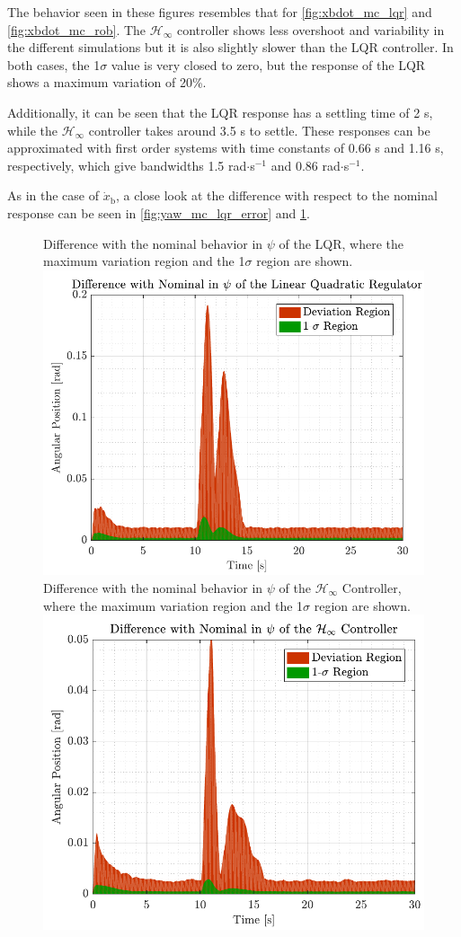 The behavior seen in these figures resembles that for \autoref{fig:xbdot_mc_lqr} and \ref{fig:xbdot_mc_rob}. The $\mathcal{H}_\infty$ controller shows less overshoot and variability in the different simulations but it is also slightly slower than the LQR controller. In both cases, the 1$\sigma$ value is very closed to zero, but the response of the LQR shows a maximum variation of 20\%.

Additionally, it can be seen that the LQR response has a settling time of 2 s, while the $\mathcal{H}_\infty$ controller takes around \num{3.5} s to settle. These responses can be approximated with first order systems with time constants of \num{0.66} s and \num{1.16} s, respectively, which give bandwidths \num{1.5} rad$\cdot$s$^{-1}$ and \num{0.86} rad$\cdot$s$^{-1}$.

As in the case of $\dot{x}_\mathrm{b}$, a close look at the difference with respect to the nominal response can be seen in \autoref{fig:yaw_mc_lqr_error} and \ref{fig:yaw_mc_rob_error}.
\begin{figure}[H]
    \captionbox 
    {   
        Difference with the nominal behavior in $\psi$ of the LQR, where the maximum variation region and the 1$\sigma$ region are shown.
        \label{fig:yaw_mc_lqr_error}
    }                                                                 
    {                                                                  
        \includegraphics[width=.45\textwidth]{figures/yaw_mc_lqr_error}         
    }                                                                    
    \hspace{5pt}                                                          
    \captionbox  
    {   
        Difference with the nominal behavior in $\psi$ of the $\mathcal{H}_\infty$ Controller, where the maximum variation region and the 1$\sigma$ region are shown.   
        \label{fig:yaw_mc_rob_error}
    }                                                                          
    {
        \includegraphics[width=.45\textwidth]{figures/yaw_mc_rob_error}
    }
\end{figure}

